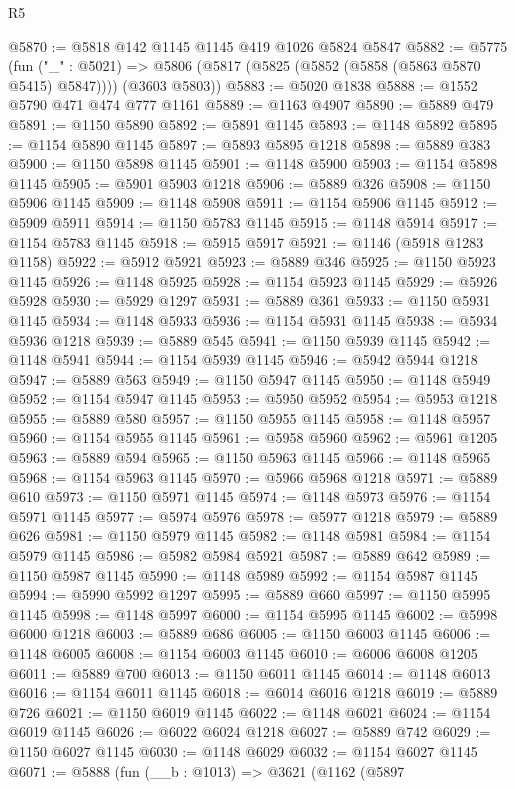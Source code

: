\begin{lexlean}{R5}
\begin{coremodule}
@5870 := @5818 @142 @1145 @1145 @419 @1026 @5824 @5847
@5882 := @5775
    (fun ("_" : @5021) =>
    @5806 (@5817 (@5825 (@5852 (@5858 (@5863 @5870 @5415) @5847)))) (@3603 @5803))
@5883 := @5020 @1838
@5888 := @1552 @5790 @471 @474 @777 @1161
@5889 := @1163 @4907
@5890 := @5889 @479
@5891 := @1150 @5890
@5892 := @5891 @1145
@5893 := @1148 @5892
@5895 := @1154 @5890 @1145
@5897 := @5893 @5895 @1218
@5898 := @5889 @383
@5900 := @1150 @5898 @1145
@5901 := @1148 @5900
@5903 := @1154 @5898 @1145
@5905 := @5901 @5903 @1218
@5906 := @5889 @326
@5908 := @1150 @5906 @1145
@5909 := @1148 @5908
@5911 := @1154 @5906 @1145
@5912 := @5909 @5911
@5914 := @1150 @5783 @1145
@5915 := @1148 @5914
@5917 := @1154 @5783 @1145
@5918 := @5915 @5917
@5921 := @1146 (@5918 @1283 @1158)
@5922 := @5912 @5921
@5923 := @5889 @346
@5925 := @1150 @5923 @1145
@5926 := @1148 @5925
@5928 := @1154 @5923 @1145
@5929 := @5926 @5928
@5930 := @5929 @1297
@5931 := @5889 @361
@5933 := @1150 @5931 @1145
@5934 := @1148 @5933
@5936 := @1154 @5931 @1145
@5938 := @5934 @5936 @1218
@5939 := @5889 @545
@5941 := @1150 @5939 @1145
@5942 := @1148 @5941
@5944 := @1154 @5939 @1145
@5946 := @5942 @5944 @1218
@5947 := @5889 @563
@5949 := @1150 @5947 @1145
@5950 := @1148 @5949
@5952 := @1154 @5947 @1145
@5953 := @5950 @5952
@5954 := @5953 @1218
@5955 := @5889 @580
@5957 := @1150 @5955 @1145
@5958 := @1148 @5957
@5960 := @1154 @5955 @1145
@5961 := @5958 @5960
@5962 := @5961 @1205
@5963 := @5889 @594
@5965 := @1150 @5963 @1145
@5966 := @1148 @5965
@5968 := @1154 @5963 @1145
@5970 := @5966 @5968 @1218
@5971 := @5889 @610
@5973 := @1150 @5971 @1145
@5974 := @1148 @5973
@5976 := @1154 @5971 @1145
@5977 := @5974 @5976
@5978 := @5977 @1218
@5979 := @5889 @626
@5981 := @1150 @5979 @1145
@5982 := @1148 @5981
@5984 := @1154 @5979 @1145
@5986 := @5982 @5984 @5921
@5987 := @5889 @642
@5989 := @1150 @5987 @1145
@5990 := @1148 @5989
@5992 := @1154 @5987 @1145
@5994 := @5990 @5992 @1297
@5995 := @5889 @660
@5997 := @1150 @5995 @1145
@5998 := @1148 @5997
@6000 := @1154 @5995 @1145
@6002 := @5998 @6000 @1218
@6003 := @5889 @686
@6005 := @1150 @6003 @1145
@6006 := @1148 @6005
@6008 := @1154 @6003 @1145
@6010 := @6006 @6008 @1205
@6011 := @5889 @700
@6013 := @1150 @6011 @1145
@6014 := @1148 @6013
@6016 := @1154 @6011 @1145
@6018 := @6014 @6016 @1218
@6019 := @5889 @726
@6021 := @1150 @6019 @1145
@6022 := @1148 @6021
@6024 := @1154 @6019 @1145
@6026 := @6022 @6024 @1218
@6027 := @5889 @742
@6029 := @1150 @6027 @1145
@6030 := @1148 @6029
@6032 := @1154 @6027 @1145
@6071 := @5888
    (fun (__b : @1013) =>
    @3621
      (@1162
        (@5897

\end{coremodule}
\end{lexlean}
